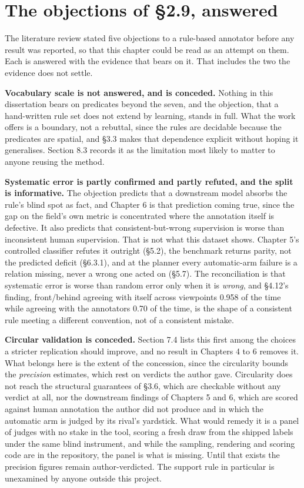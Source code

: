\section{The objections of \S{}2.9, answered}

The literature review stated five objections to a rule-based annotator before any result was reported, so that this chapter could be read as an attempt on them. Each is answered with the evidence that bears on it. That includes the two the evidence does not settle.

\textbf{Vocabulary scale is not answered, and is conceded.} Nothing in this dissertation bears on predicates beyond the seven, and the objection, that a hand-written rule set does not extend by learning, stands in full. What the work offers is a boundary, not a rebuttal, since the rules are decidable because the predicates are spatial, and \S{}3.3 makes that dependence explicit without hoping it generalises. Section 8.3 records it as the limitation most likely to matter to anyone reusing the method.

\textbf{Systematic error is partly confirmed and partly refuted, and the split is informative.} The objection predicts that a downstream model absorbs the rule's blind spot as fact, and Chapter 6 is that prediction coming true, since the gap on the field's own metric is concentrated where the annotation itself is defective. It also predicts that consistent-but-wrong supervision is worse than inconsistent human supervision. That is not what this dataset shows. Chapter 5's controlled classifier refutes it outright (\S{}5.2), the benchmark returns parity, not the predicted deficit (\S{}6.3.1), and at the planner every automatic-arm failure is a relation missing, never a wrong one acted on (\S{}5.7). The reconciliation is that systematic error is worse than random error only when it is \textit{wrong}, and \S{}4.12's finding, front/behind agreeing with itself across viewpoints 0.958 of the time while agreeing with the annotators 0.70 of the time, is the shape of a consistent rule meeting a different convention, not of a consistent mistake.

\textbf{Circular validation is conceded.} Section 7.4 lists this first among the choices a stricter replication should improve, and no result in Chapters 4 to 6 removes it. What belongs here is the extent of the concession, since the circularity bounds the \textit{precision} estimates, which rest on verdicts the author gave. Circularity does not reach the structural guarantees of \S{}3.6, which are checkable without any verdict at all, nor the downstream findings of Chapters 5 and 6, which are scored against human annotation the author did not produce and in which the automatic arm is judged by its rival's yardstick. What would remedy it is a panel of judges with no stake in the tool, scoring a fresh draw from the shipped labels under the same blind instrument, and while the sampling, rendering and scoring code are in the repository, the panel is what is missing. Until that exists the precision figures remain author-verdicted. The support rule in particular is unexamined by anyone outside this project.

